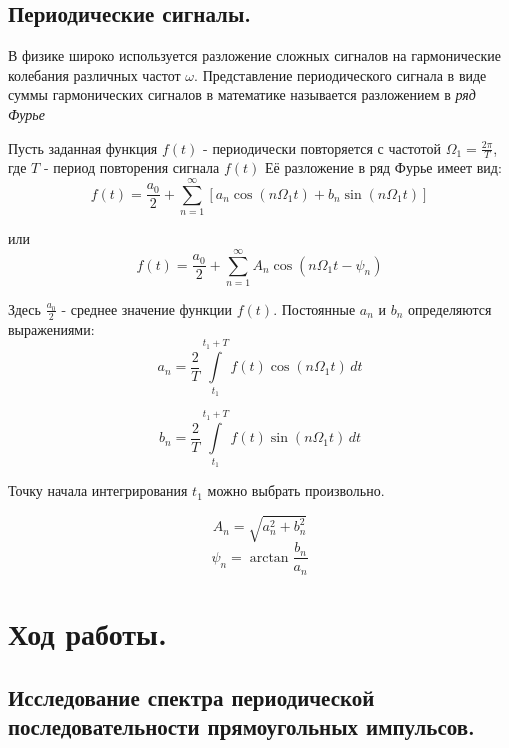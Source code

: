 \documentclass[a4paper, 12pt,twoside]{article}
\begin{document}
\subsection{Периодические сигналы.}

В физике широко используется разложение сложных сигналов на гармонические колебания различных частот $\omega$. Представление периодического сигнала в виде суммы гармонических сигналов в математике называется разложением в \textit {ряд Фурье}

Пусть заданная функция $f(t)$ - периодически повторяется с частотой $\Omega_{1}=\frac{2\pi}{T}$, где $T$ - период повторения сигнала $f(t)$
Её разложение в ряд Фурье имеет вид:
\begin{equation}
\label{form:furie}	
	f(t)=\frac{a_{0}}{2}+\sum\limits_{n=1}^{\infty}[a_{n}\cos(n\Omega_{1}t)+b_{n}\sin(n\Omega_{1}t)] 
\end{equation}

или
\begin{equation}
	f(t)=\frac{a_{0}}{2}+\sum\limits_{n=1}^{\infty}A_{n}\cos(n\Omega_{1}t-\psi_{n}) 
\label{form:furie_2}
\end{equation}

Здесь $\frac{a_{0}}{2}$ - среднее значение функции $f(t)$. Постоянные $a_n$ и $b_n$ определяются выражениями:
\begin{equation}
\label{form:a_n}
	a_{n} = \frac{2}{T}\int\limits_{t_{1}}^{t_{1}+T}f(t)\cos(n\Omega_1t)\, dt
\end{equation}

\begin{equation}
	b_{n} = \frac{2}{T}\int\limits_{t_{1}}^{t_{1}+T}f(t)\sin(n\Omega_{1}t)\, dt 
\label{form:b_n}
\end{equation}

Точку начала интегрирования $t_{1}$ можно выбрать произвольно.

\begin{equation}
\label{form:A_n}
	A_{n} = \sqrt{a_{n}^2+b_{n}^2}
\end{equation}
\begin{equation}
	\psi_{n} = \arctan\frac{b_{n}}{a_{n}}
\label{form:psi_n}
\end{equation}

\section{Ход работы.}
\subsection{Исследование спектра периодической последовательности прямоугольных импульсов.}
\end{document}
